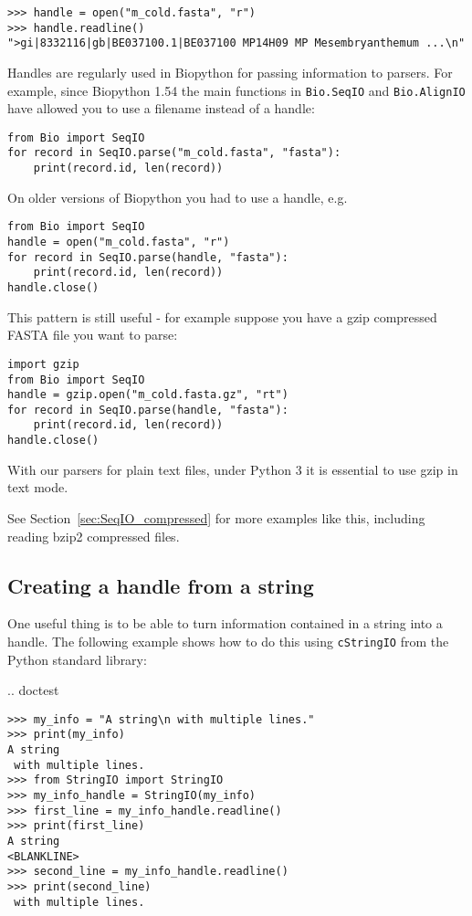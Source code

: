 \begin{verbatim}
>>> handle = open("m_cold.fasta", "r")
>>> handle.readline()
">gi|8332116|gb|BE037100.1|BE037100 MP14H09 MP Mesembryanthemum ...\n"
\end{verbatim}

Handles are regularly used in Biopython for passing information to parsers.
For example, since Biopython 1.54 the main functions in \verb|Bio.SeqIO|
and \verb|Bio.AlignIO| have allowed you to use a filename instead of a
handle:

\begin{verbatim}
from Bio import SeqIO
for record in SeqIO.parse("m_cold.fasta", "fasta"):
    print(record.id, len(record))
\end{verbatim}

On older versions of Biopython you had to use a handle, e.g.

\begin{verbatim}
from Bio import SeqIO
handle = open("m_cold.fasta", "r")
for record in SeqIO.parse(handle, "fasta"):
    print(record.id, len(record))
handle.close()
\end{verbatim}

This pattern is still useful - for example suppose you have a gzip
compressed FASTA file you want to parse:

\begin{verbatim}
import gzip
from Bio import SeqIO
handle = gzip.open("m_cold.fasta.gz", "rt")
for record in SeqIO.parse(handle, "fasta"):
    print(record.id, len(record))
handle.close()
\end{verbatim}

With our parsers for plain text files, under Python 3 it is
essential to use gzip in text mode.

See Section~\ref{sec:SeqIO_compressed} for more examples like this,
including reading bzip2 compressed files.

\subsection{Creating a handle from a string}

One useful thing is to be able to turn information contained in a
string into a handle. The following example shows how to do this using
\verb|cStringIO| from the Python standard library:

\pandocignoreme .. doctest
\begin{verbatim}
>>> my_info = "A string\n with multiple lines."
>>> print(my_info)
A string
 with multiple lines.
>>> from StringIO import StringIO
>>> my_info_handle = StringIO(my_info)
>>> first_line = my_info_handle.readline()
>>> print(first_line)
A string
<BLANKLINE>
>>> second_line = my_info_handle.readline()
>>> print(second_line)
 with multiple lines.
\end{verbatim}
